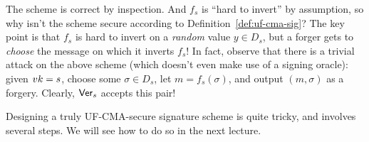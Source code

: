 \documentclass[11pt]{article}
\begin{document}
The scheme is correct by inspection.  And $f_{s}$ is ``hard to
invert'' by assumption, so why isn't the scheme secure according to
Definition~\ref{def:uf-cma-sig}?  The key point is that $f_{s}$ is
hard to invert on a \emph{random} value $y \in D_{s}$, but a forger
gets to \emph{choose} the message on which it inverts $f_{s}$!  In
fact, observe that there is a trivial attack on the above scheme
(which doesn't even make use of a signing oracle): given $vk = s$,
choose some $\sigma \in D_{s}$, let $m = f_{s}(\sigma)$, and output
$(m,\sigma)$ as a forgery.  Clearly, $\mathsf{Ver}_{s}$ accepts this pair!

Designing a truly UF-CMA-secure signature scheme is quite tricky, and
involves several steps.  We will see how to do so in the next lecture.
\end{document}
